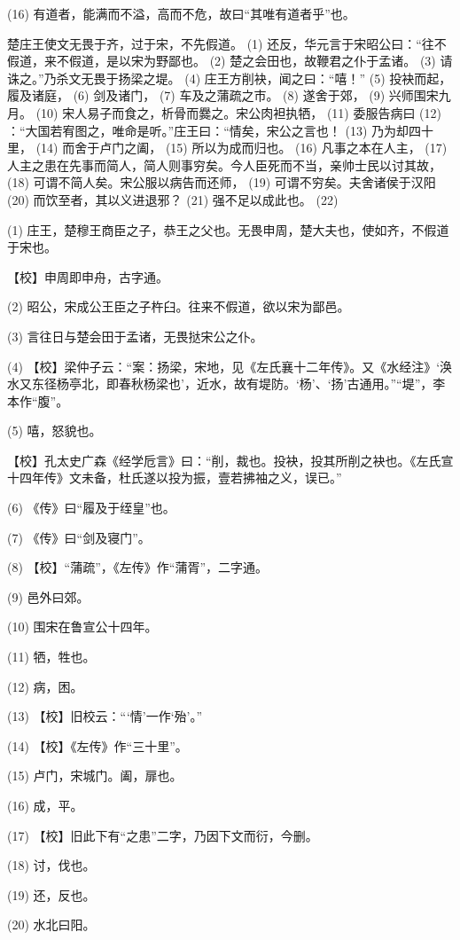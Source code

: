 \documentclass[12pt,UTF8]{ctexbook}
\begin{document}
(16) 有道者，能满而不溢，高而不危，故曰“其唯有道者乎”也。

楚庄王使文无畏于齐，过于宋，不先假道。 (1) 还反，华元言于宋昭公曰：“往不假道，来不假道，是以宋为野鄙也。 (2) 楚之会田也，故鞭君之仆于孟诸。 (3) 请诛之。”乃杀文无畏于扬梁之堤。 (4) 庄王方削袂，闻之曰：“嘻！” (5) 投袂而起，履及诸庭， (6) 剑及诸门， (7) 车及之蒲疏之市。 (8) 遂舍于郊， (9) 兴师围宋九月。 (10) 宋人易子而食之，析骨而爨之。宋公肉袒执牺， (11) 委服告病曰 (12) ：“大国若宥图之，唯命是听。”庄王曰：“情矣，宋公之言也！ (13) 乃为却四十里， (14) 而舍于卢门之阖， (15) 所以为成而归也。 (16) 凡事之本在人主， (17) 人主之患在先事而简人，简人则事穷矣。今人臣死而不当，亲帅士民以讨其故， (18) 可谓不简人矣。宋公服以病告而还师， (19) 可谓不穷矣。夫舍诸侯于汉阳 (20) 而饮至者，其以义进退邪？ (21) 强不足以成此也。 (22)

(1) 庄王，楚穆王商臣之子，恭王之父也。无畏申周，楚大夫也，使如齐，不假道于宋也。

【校】申周即申舟，古字通。

(2) 昭公，宋成公王臣之子杵臼。往来不假道，欲以宋为鄙邑。

(3) 言往日与楚会田于孟诸，无畏挞宋公之仆。

(4) 【校】梁仲子云：“案：扬梁，宋地，见《左氏襄十二年传》。又《水经注》‘涣水又东径杨亭北，即春秋杨梁也’，近水，故有堤防。‘杨’、‘扬’古通用。”“堤”，李本作“腹”。

(5) 嘻，怒貌也。

【校】孔太史广森《经学卮言》曰：“削，裁也。投袂，投其所削之袂也。《左氏宣十四年传》文未备，杜氏遂以投为振，壹若拂袖之义，误已。”

(6) 《传》曰“履及于绖皇”也。

(7) 《传》曰“剑及寝门”。

(8) 【校】“蒲疏”，《左传》作“蒲胥”，二字通。

(9) 邑外曰郊。

(10) 围宋在鲁宣公十四年。

(11) 牺，牲也。

(12) 病，困。

(13) 【校】旧校云：“‘情’一作‘殆’。”

(14) 【校】《左传》作“三十里”。

(15) 卢门，宋城门。阖，扉也。

(16) 成，平。

(17) 【校】旧此下有“之患”二字，乃因下文而衍，今删。

(18) 讨，伐也。

(19) 还，反也。

(20) 水北曰阳。
\end{document}
